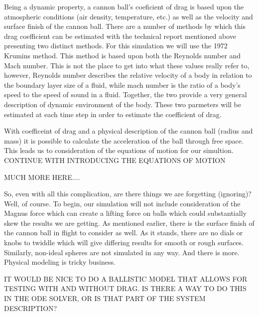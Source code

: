 \documentclass[letterpaper,10pt]{book}
\begin{document}
      Being a dynamic property, a cannon ball's coeficient of drag is based upon the atmospheric conditions (air density, temperature, etc.) as well as the velocity and surface finish of the cannon ball.  There are a number of methods by which this drag coefficient can be estimated with the technical report mentioned above presenting two distinct methods.  For this simulation we will use the 1972 Krumins method.  This method is based upon both the Reynolds number and Mach number.  This is not the place to get into what these values really refer to, however, Reynolds number describes the relative velocity of a body in relation to the boundary layer size of a fluid, while mach number is the ratio of a body's speed to the speed of sound in a fluid.  Together, the two provide a very general description of dynamic environment of the body.  These two parmeters will be estimated at each time step in order to estimate the coefficient of drag.
	
      With coefficeint of drag and a physical description of the cannon ball (radius and mass) it is possible to calculate the acceleration of the ball through free space.  This leads us to consideration of the equations of motion for our simultion. CONTINUE WITH INTRODUCING THE EQUATIONS OF MOTION
      
      MUCH MORE HERE....
      
      So, even with all this complication, are there things we are forgetting (ignoring)?  Well, of course.  To begin, our simulation will not include consideration of the Magnus force which can create a lifting force on balls which could substantially skew the results we are getting.  As mentioned earlier, there is the surface finish of the cannon ball in flight to consider as well.  As it stands, there are no dials or knobs to twiddle which will give differing results for smooth or rough surfaces.  Similarly, non-ideal spheres are not simulated in any way.  And there is more.  Physical modeling is tricky business.
      
      IT WOULD BE NICE TO DO A BALLISTIC MODEL THAT ALLOWS FOR TESTING WITH AND WITHOUT DRAG.  IS THERE A WAY TO DO THIS IN THE ODE SOLVER, OR IS THAT PART OF THE SYSTEM DESCRIPTION?
\end{document}
